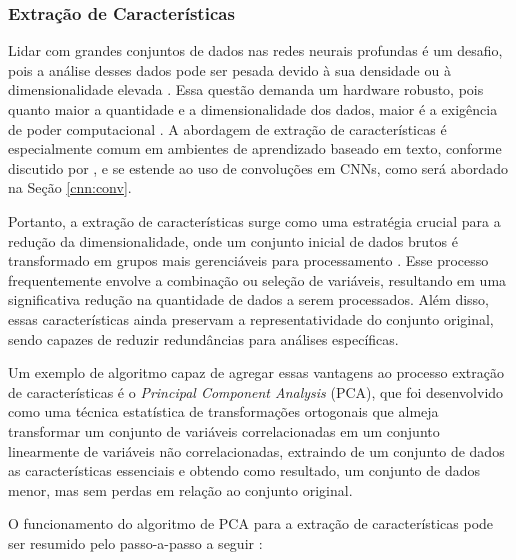 \subsubsection{Extração de Características}
\label{project:feature_extraction}

Lidar com grandes conjuntos de dados nas redes neurais profundas é um desafio, pois a análise desses dados pode ser pesada devido à sua densidade ou à dimensionalidade elevada \citep{Liang2017TextReview}. Essa questão demanda um hardware robusto, pois quanto maior a quantidade e a dimensionalidade dos dados, maior é a exigência de poder computacional \citep{Benyahia2022Multi-featuresClassification}. A abordagem de extração de características é especialmente comum em ambientes de aprendizado baseado em texto, conforme discutido por \cite{Liang2017TextReview}, e se estende ao uso de convoluções em CNNs, como será abordado na Seção \ref{cnn:conv}.

Portanto, a extração de características surge como uma estratégia crucial para a redução da dimensionalidade, onde um conjunto inicial de dados brutos é transformado em grupos mais gerenciáveis para processamento \citep{Benyahia2022Multi-featuresClassification}. Esse processo frequentemente envolve a combinação ou seleção de variáveis, resultando em uma significativa redução na quantidade de dados a serem processados. Além disso, essas características ainda preservam a representatividade do conjunto original, sendo capazes de reduzir redundâncias para análises específicas.

Um exemplo de algoritmo capaz de agregar essas vantagens ao processo extração de características é o \textit{Principal Component Analysis} (PCA), que foi desenvolvido como uma técnica estatística de transformações ortogonais que almeja transformar um conjunto de variáveis correlacionadas em um conjunto linearmente de variáveis não correlacionadas, extraindo de um conjunto de dados as características essenciais \citep{Wold1987PrincipalAnalysis} e obtendo como resultado, um conjunto de dados menor, mas sem perdas em relação ao conjunto original.

O funcionamento do algoritmo de PCA para a extração de características pode ser resumido pelo passo-a-passo a seguir \citep{Song2010FeatureAnalysis}:

